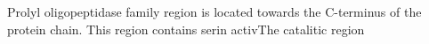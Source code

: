 Prolyl oligopeptidase family region is located towards the C-terminus of the protein chain. This region contains serin activThe catalitic region 